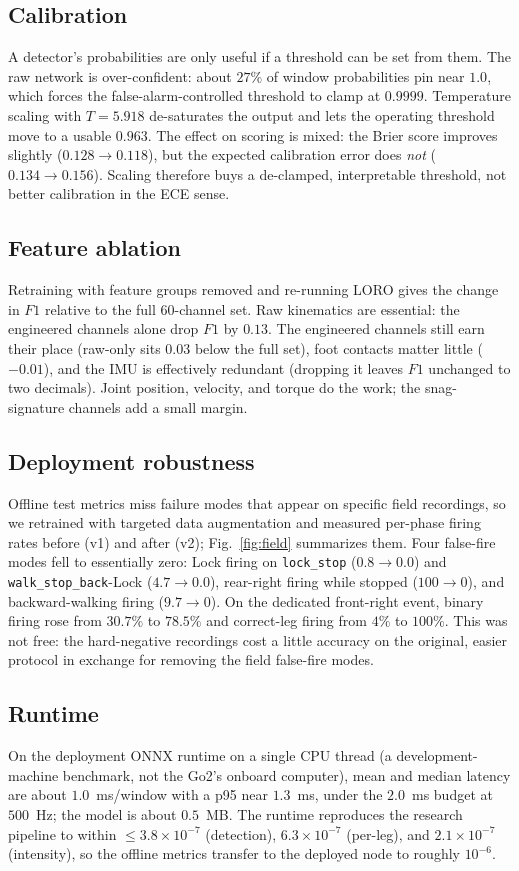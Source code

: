 \subsection{Calibration}
A detector's probabilities are only useful if a threshold can be set from them. The raw network is over-confident: about $27\%$ of window probabilities pin near $1.0$, which forces the false-alarm-controlled threshold to clamp at $0.9999$. Temperature scaling with $T = 5.918$ de-saturates the output and lets the operating threshold move to a usable $0.963$. The effect on scoring is mixed: the Brier score improves slightly ($0.128 \to 0.118$), but the expected calibration error does \emph{not} ($0.134 \to 0.156$). Scaling therefore buys a de-clamped, interpretable threshold, not better calibration in the ECE sense.

\subsection{Feature ablation}
Retraining with feature groups removed and re-running LORO gives the change in $F1$ relative to the full 60-channel set. Raw kinematics are essential: the engineered channels alone drop $F1$ by $0.13$. The engineered channels still earn their place (raw-only sits $0.03$ below the full set), foot contacts matter little ($-0.01$), and the IMU is effectively redundant (dropping it leaves $F1$ unchanged to two decimals). Joint position, velocity, and torque do the work; the snag-signature channels add a small margin.

\subsection{Deployment robustness}
Offline test metrics miss failure modes that appear on specific field recordings, so we retrained with targeted data augmentation and measured per-phase firing rates before (v1) and after (v2); Fig.~\ref{fig:field} summarizes them. Four false-fire modes fell to essentially zero: Lock firing on \texttt{lock\_stop} ($0.8 \to 0.0$) and \texttt{walk\_stop\_back}-Lock ($4.7 \to 0.0$), rear-right firing while stopped ($100 \to 0$), and backward-walking firing ($9.7 \to 0$). On the dedicated front-right event, binary firing rose from $30.7\%$ to $78.5\%$ and correct-leg firing from $4\%$ to $100\%$. This was not free: the hard-negative recordings cost a little accuracy on the original, easier protocol in exchange for removing the field false-fire modes.

\subsection{Runtime}
On the deployment ONNX runtime on a single CPU thread (a development-machine benchmark, not the Go2's onboard computer), mean and median latency are about $1.0$~ms/window with a p95 near $1.3$~ms, under the $2.0$~ms budget at $500$~Hz; the model is about $0.5$~MB. The runtime reproduces the research pipeline to within $\leq 3.8\times10^{-7}$ (detection), $6.3\times10^{-7}$ (per-leg), and $2.1\times10^{-7}$ (intensity), so the offline metrics transfer to the deployed node to roughly $10^{-6}$.
